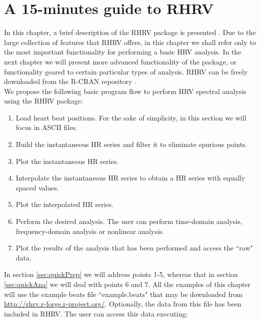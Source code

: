 \chapter{A 15-minutes guide to RHRV\label{ch:Quick}}
In this chapter, a brief description of the RHRV package is presented \cite{vilaRHRV}. Due to the large collection of features that RHRV offers, in this chapter we shall refer only to the most important functionality for performing  a basic \gls{HRV} analysis. In the next chapter we will present more advanced functionality of the package, or functionality geared to certain particular types of analysis. RHRV can be freely downloaded from the R-CRAN repository \cite{cran}.\\

We propose the following basic program flow to perform \gls{HRV} spectral analysis using the RHRV package:

\begin{enumerate}
\item Load heart beat positions. For the sake of simplicity, in this section we will focus in
ASCII files. 
\item Build the instantaneous \gls{HR} series and filter it to eliminate spurious points.
\item Plot the instantaneous \gls{HR} series.
\item Interpolate the instantaneous \gls{HR} series to obtain a \gls{HR} series with equally spaced values.
\item Plot the interpolated \gls{HR} series.
\item Perform the desired analysis. The user can perform time-domain analysis, frequency-domain analysis or nonlinear analysis.
\item Plot the results of the analysis that has been performed and access the ``raw" data.
\end{enumerate}
In section \ref{sec:quickPrep} we will address points 1-5, whereas that in section \ref{sec:quickAna} we will deal with points 6 and 7. All the examples of this chapter will use the 
example beats file ``example.beats" that may be downloaded from \href{http://rhrv.r-forge.r-project.org/}{http://rhrv.r-forge.r-project.org/}. Optionally, the data from this file has been included in RHRV. The user can access this data executing:

